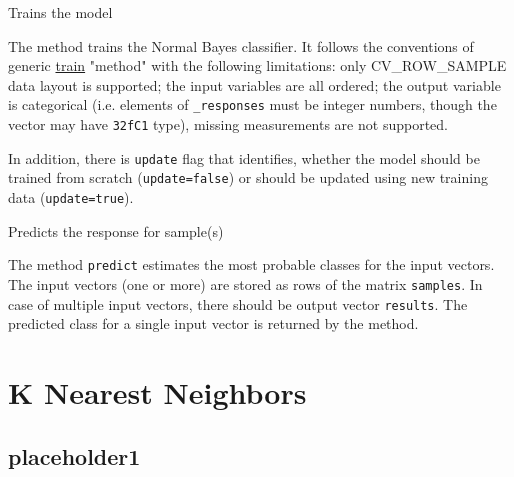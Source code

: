 
Trains the model


The method trains the Normal Bayes classifier. It follows the conventions of generic \href{#CvStatModel\_train}{train} "method" with the following limitations: only CV\_ROW\_SAMPLE data layout is supported; the input variables are all ordered; the output variable is categorical (i.e. elements of \texttt{\_responses} must be integer numbers, though the vector may have \texttt{32fC1} type), missing measurements are not supported.

In addition, there is \texttt{update} flag that identifies, whether the model should be trained from scratch (\texttt{update=false}) or should be updated using new training data (\texttt{update=true}).


Predicts the response for sample(s)


The method \texttt{predict} estimates the most probable classes for the input vectors. The input vectors (one or more) are stored as rows of the matrix \texttt{samples}. In case of multiple input vectors, there should be output vector \texttt{results}. The predicted class for a single input vector is returned by the method.

\section{K Nearest Neighbors}

\subsection{placeholder1}

